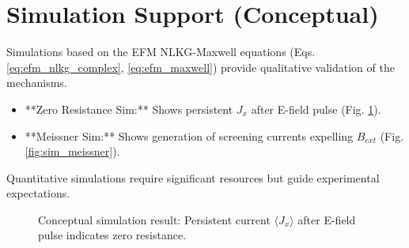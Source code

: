 \documentclass[a4paper,12pt]{article}
\begin{document}
\section{Simulation Support (Conceptual)}
Simulations based on the EFM NLKG-Maxwell equations (Eqs. \ref{eq:efm_nlkg_complex}, \ref{eq:efm_maxwell}) provide qualitative validation of the mechanisms.
\begin{itemize}
    \item **Zero Resistance Sim:** Shows persistent \(J_x\) after E-field pulse (Fig. \ref{fig:sim_zero_r}).
    \item **Meissner Sim:** Shows generation of screening currents expelling \(B_{ext}\) (Fig. \ref{fig:sim_meissner}).
\end{itemize}
Quantitative simulations require significant resources but guide experimental expectations.

\begin{figure}[h]
    \centering
    \caption{Conceptual simulation result: Persistent current \(\langle J_x \rangle\) after E-field pulse indicates zero resistance.}
    \label{fig:sim_zero_r}
\end{figure}
\end{document}
